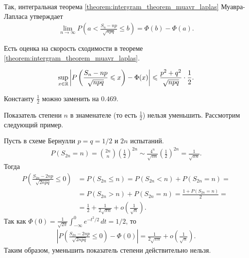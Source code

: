 \documentclass[../main.tex]{subfiles}
\begin{document}
Так, интегральная теорема \ref{theorem:intergram_theorem_muavr_laplas} Муавра-Лапласа утверждает
\begin{align*}
 \lim_{n \to \infty} P \left( a < \frac{S_n-np}{\sqrt{npq}} \leqslant b \right) =\Phi(b)-\Phi(a).
\end{align*}

Есть оценка на скорость сходимости в теореме \ref{theorem:intergram_theorem_muavr_laplas}.

\begin{thm}
 \begin{align*}
  \sup_{x \in \mathbb{R}} \left| P \left( \frac{S_n - np}{\sqrt{npq}} \leqslant x \right) - \Phi(x) \right| \leqslant \frac{p^{2}+q^{2}}{\sqrt{npq}} \cdot \frac{1}{2}
 .\end{align*}
\end{thm}

\begin{remrk}
 Константу $\frac{1}{2}$ можно заменить на $0.469$.
\end{remrk}

\begin{remrk}
 Показатель степени $n$ в знаменателе (то есть $\frac{1}{2}$) нельзя уменьшить. Рассмотрим следующий пример.
\end{remrk}

\begin{exmpl}
 Пусть в схеме Бернулли $p = q = 1 / 2$ и $2n$ испытаний.
 \begin{align*}
  P(S_{2n} = n) = \binom {2n} n \left( \frac{1}{2} \right)^{2n} \sim \frac{4^{n}}{\sqrt{\pi n}} \left( \frac{1}{2} \right)^{2n} = \frac{1}{\sqrt{\pi n}}.
 \end{align*} Тогда
 \begin{align*}
  P \left( \frac{S_{2n} - 2np}{\sqrt{2npq}} \leqslant 0 \right) &= P(S_{2n} \leqslant n) = P(S_{2n} < n) + P(S_{2n} = n) = \\
  &= P(S_{2n} > n) + P(S_{2n} = n) = \frac{1 + P(S_{2n} = n)}{2} = \\
  &= \frac{1}{2} + \frac{1}{2 \sqrt{\pi n}} + o \left( \frac{1}{\sqrt{n}} \right).
 \end{align*} Так как $ \Phi(0) = \frac{1}{\sqrt{2\pi}} \int_{-\infty}^{0} e^{-t^{2} / 2}\,dt = 1 / 2 $, то
 \begin{align*}
  \left|P \left( \frac{S_{2n}-2np}{\sqrt{2npq}} \leqslant 0 \right) - \Phi(0) \right| = \frac{1}{2\sqrt{\pi n}} + o \left( \frac{1}{\sqrt n} \right).
 \end{align*} Таким образом, уменьшить показатель степени действительно нельзя.
\end{exmpl}
\end{document}
